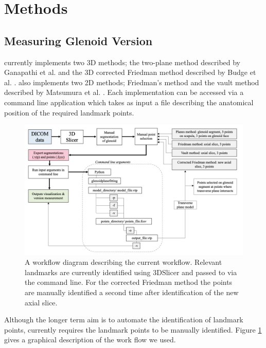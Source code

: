 \section{Methods}
\subsection{Measuring Glenoid Version}
\label{sec:methods}
\sksglenoid currently implements two 3D methods; the two-plane method described by Ganapathi et al. \cite{PMID:20933439} and the 3D corrected 
Friedman method described by Budge et al. \cite{BUDGE2011577}. \sksglenoid also implements two
2D methods; Friedman's method \cite{PMID:1522089} and the vault method described by Matsumura et al. \cite{PMID:24618285}. Each implementation can be accessed via a command line application which takes as 
input a file describing the anatomical position of the required landmark points.

\begin{figure}
        \begin{center}
                \includegraphics[width=0.98\linewidth]{figures/workflow.png}
                        \caption{\label{fig:workflow}A workflow diagram describing the current workflow. Relevant landmarks 
			are currently identified using 3DSlicer and passed to \sksglenoid via the command line. For the corrected Friedman method the points are manually identified 
			a second time after identification of the new axial slice.}
        \end{center}
\end{figure}

Although the longer term aim is to automate the identification of landmark points, \sksglenoid currently requires the landmark points to be manually identified. 
Figure \ref{fig:workflow} gives a graphical description of the work flow we used. 

